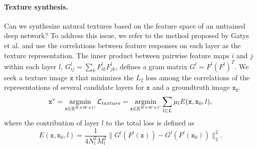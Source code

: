 \documentclass{article}
\begin{document}
\paragraph{Texture synthesis.} Can we synthesize natural textures based on the feature space of an untrained deep network?
To address this issue, we refer to the method proposed by Gatys et al.\cite{Gatys2015texture} and use the correlations between feature responses on each layer as the texture representation. %
The inner product between pairwise feature maps $i$ and $j$ within each layer $l$, $G_{ij}^l = \sum_{k} F_{ik}^lF_{jk}^l$, defines a gram matrix $G^l = F^l (F^l)^T$. %
We seek a texture image $\texttt{x}$ that minimizes the $L_2$ loss among the correlations of the representations of several candidate layers for $\texttt{x}$ and a groundtruth image $\texttt{x}_0$.
\setlength{\belowdisplayskip}{2pt}
\setlength{\abovedisplayskip}{2pt}
\begin{equation}
\texttt{x}^* = \operatornamewithlimits{argmin}_{ \texttt{x} \in \mathbb{R}^{H \times W \times C} } \mathcal{L}_{texture}  = \operatornamewithlimits{argmin}_{ \texttt{x} \in \mathbb{R}^{H \times W \times C} } \sum_{l \in L} \mu_l E(\texttt{x},\texttt{x}_0,l),
\label{eq:textureLoss}
\end{equation}
where the contribution of layer $l$ to the total loss is defined as
\setlength{\belowdisplayskip}{2pt}
\setlength{\abovedisplayskip}{2pt}
\begin{equation}
E(\texttt{x},\texttt{x}_0,l)  = \frac{1}{4N_l^2 M_l^2}  \lVert G^l(F^l(\texttt{x}))- G^l(F^l(\texttt{x}_0)) \rVert _2^2.
\label{eq:textureLoss}
\end{equation}
\end{document}
